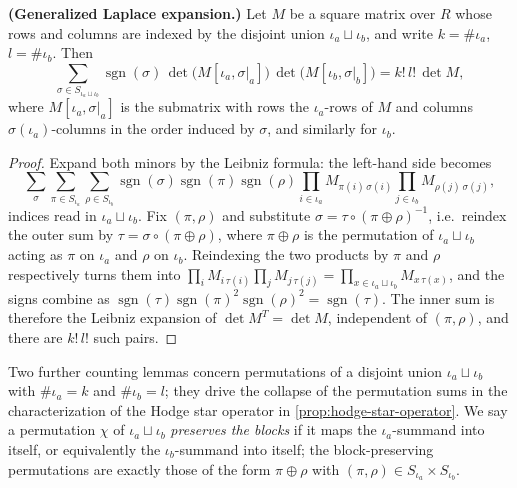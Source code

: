 \begin{proposition}
\label{lem:laplace-expansion-block}




\textbf{(Generalized Laplace expansion.)} Let $M$ be a square matrix over $R$ whose rows and columns are indexed by the disjoint union $\iota_a \sqcup \iota_b$, and write $k = \#\iota_a$, $l = \#\iota_b$. Then
\[
\sum_{\sigma \in S_{\iota_a \sqcup \iota_b}} \operatorname{sgn}(\sigma)\, \det\big(M[\iota_a, \sigma|_a]\big)\, \det\big(M[\iota_b, \sigma|_b]\big) = k!\, l!\, \det M,
\]
where $M[\iota_a, \sigma|_a]$ is the submatrix with rows the $\iota_a$-rows of $M$ and columns $\sigma(\iota_a)$-columns in the order induced by $\sigma$, and similarly for $\iota_b$.
\end{proposition}
\begin{proof}

Expand both minors by the Leibniz formula: the left-hand side becomes
\[
\sum_{\sigma} \sum_{\pi \in S_{\iota_a}} \sum_{\rho \in S_{\iota_b}} \operatorname{sgn}(\sigma)\operatorname{sgn}(\pi)\operatorname{sgn}(\rho) \prod_{i \in \iota_a} M_{\pi(i)\, \sigma(i)} \prod_{j \in \iota_b} M_{\rho(j)\, \sigma(j)},
\]
indices read in $\iota_a \sqcup \iota_b$. Fix $(\pi, \rho)$ and substitute $\sigma = \tau \circ (\pi \oplus \rho)^{-1}$, i.e.\ reindex the outer sum by $\tau = \sigma \circ (\pi \oplus \rho)$, where $\pi \oplus \rho$ is the permutation of $\iota_a \sqcup \iota_b$ acting as $\pi$ on $\iota_a$ and $\rho$ on $\iota_b$. Reindexing the two products by $\pi$ and $\rho$ respectively turns them into $\prod_{i} M_{i\,\tau(i)} \prod_{j} M_{j\,\tau(j)} = \prod_{x \in \iota_a \sqcup \iota_b} M_{x\,\tau(x)}$, and the signs combine as $\operatorname{sgn}(\tau)\operatorname{sgn}(\pi)^2\operatorname{sgn}(\rho)^2 = \operatorname{sgn}(\tau)$. The inner sum is therefore the Leibniz expansion of $\det M^{T} = \det M$, independent of $(\pi, \rho)$, and there are $k!\,l!$ such pairs.
\end{proof}

Two further counting lemmas concern permutations of a disjoint union $\iota_a \sqcup \iota_b$ with $\#\iota_a = k$ and $\#\iota_b = l$; they drive the collapse of the permutation sums in the characterization of the Hodge star operator in \cref{prop:hodge-star-operator}. We say a permutation $\chi$ of $\iota_a \sqcup \iota_b$ \emph{preserves the blocks} if it maps the $\iota_a$-summand into itself, or equivalently the $\iota_b$-summand into itself; the block-preserving permutations are exactly those of the form $\pi \oplus \rho$ with $(\pi, \rho) \in S_{\iota_a} \times S_{\iota_b}$.

